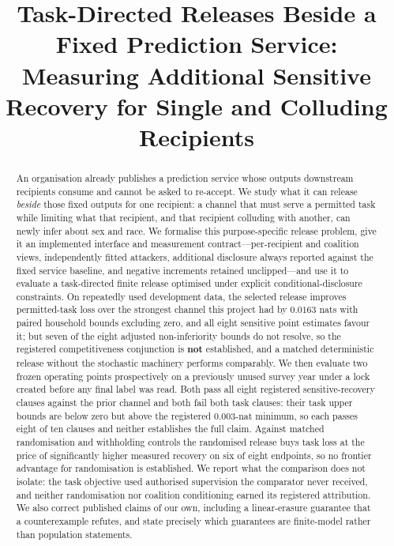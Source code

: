 \documentclass[conference]{IEEEtran}
\begin{document}
\title{Task-Directed Releases Beside a Fixed Prediction Service:\\
Measuring Additional Sensitive Recovery for Single and Colluding Recipients}

\author{}

\maketitle

\begin{abstract}
An organisation already publishes a prediction service whose outputs downstream recipients consume and
cannot be asked to re-accept. We study what it can release \emph{beside} those fixed outputs for one
recipient: a channel that must serve a permitted task while limiting what that recipient, and that
recipient colluding with another, can newly infer about sex and race. We formalise this purpose-specific
release problem, give it an implemented interface and measurement contract---per-recipient and coalition
views, independently fitted attackers, additional disclosure always reported against the fixed service
baseline, and negative increments retained unclipped---and use it to evaluate a task-directed finite
release optimised under explicit conditional-disclosure constraints. On repeatedly used development data,
the selected release improves permitted-task loss over the strongest channel this project had by
$0.0163$ nats with paired household bounds excluding zero, and all eight sensitive point estimates favour
it; but seven of the eight adjusted non-inferiority bounds do not resolve, so the registered
competitiveness conjunction is \textbf{not} established, and a matched deterministic release without the
stochastic machinery performs comparably. We then evaluate two frozen operating points prospectively on a
previously unused survey year under a lock created before any final label was read. Both pass all eight
registered sensitive-recovery clauses against the prior channel and both fail both task clauses: their
task upper bounds are below zero but above the registered $0.003$-nat minimum, so each passes eight of ten
clauses and neither establishes the full claim. Against matched randomisation and withholding controls the
randomised release buys task loss at the price of significantly higher measured recovery on six of eight
endpoints, so no frontier advantage for randomisation is established. We report what the comparison does not isolate: the task
objective used authorised supervision the comparator never received, and neither randomisation nor
coalition conditioning earned its registered attribution. We also correct published claims of our own,
including a linear-erasure guarantee that a counterexample refutes, and state precisely which guarantees
are finite-model rather than population statements.
\end{abstract}
\end{document}

